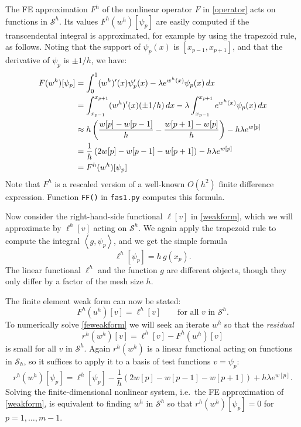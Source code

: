 \documentclass[letterpaper,final,12pt,reqno]{amsart}
\newcommand{\ip}[2]{\left<#1,#2\right>}
\begin{document}
The FE approximation $F^h$ of the nonlinear operator $F$ in \eqref{operator} acts on functions in $\mathcal{S}^h$.  Its values $F^h(w^h)[\psi_p]$ are easily computed if the transcendental integral is approximated, for example by using the trapezoid rule, as follows.  Noting that the support of $\psi_p(x)$ is $[x_{p-1},x_{p+1}]$, and that the derivative of $\psi_p$ is $\pm 1/h$, we have:
\begin{align}
  F(w^h)[\psi_p] &= \int_0^1 (w^h)'(x) \psi_p'(x) - \lambda e^{w^h(x)} \psi_p(x)\, dx  \label{feoperator} \\
    &= \int_{x_{p-1}}^{x_{p+1}} (w^h)'(x) (\pm 1/h)\,dx - \lambda \int_{x_{p-1}}^{x_{p+1}} e^{w^h(x)} \psi_p(x)\, dx \notag \\
    &\approx h \left(\frac{w[p]-w[p-1]}{h} - \frac{w[p+1]-w[p]}{h}\right) - h \lambda e^{w[p]}  \notag \\
    &= \frac{1}{h}\left(2w[p]-w[p-1]-w[p+1]\right) - h \lambda e^{w[p]} \notag \\
    &= F^h(w^h)[\psi_p] \notag
\end{align}
Note that $F^h$ is a rescaled version of a well-known $O(h^2)$ finite difference expression.  Function \texttt{FF()} in \texttt{fas1.py} computes this formula.

Now consider the right-hand-side functional $\ell[v]$ in \eqref{weakform}, which we will approximate by $\ell^h[v]$ acting on $\mathcal{S}^h$.  We again apply the trapezoid rule to compute the integral $\ip{g}{\psi_p}$, and we get the simple formula
\begin{equation}
  \ell^h[\psi_p] = h\, g(x_p). \label{ferhs}
\end{equation}
The linear functional $\ell^h$ and the function $g$ are different objects, though they only differ by a factor of the mesh size $h$.

The finite element weak form can now be stated:
\begin{equation}
  F^h(u^h)[v] = \ell^h[v] \qquad \text{for all } v \text{ in } \mathcal{S}^h. \label{feweakform}
\end{equation}
To numerically solve \eqref{feweakform} we will seek an iterate $w^h$ so that the \emph{residual}
\begin{equation}
  r^h(w^h)[v] = \ell^h[v] - F^h(w^h)[v]  \label{feresidual}
\end{equation}
is small for all $v$ in $\mathcal{S}^h$.  Again $r^h(w^h)$ is a linear functional acting on functions in $\mathcal{S}_h$, so it suffices to apply it to a basis of test functions $v=\psi_p$:
\begin{equation}
  r^h(w^h)[\psi_p] = \ell^h[\psi_p] - \frac{1}{h}\left(2w[p]-w[p-1]-w[p+1]\right) + h \lambda e^{w[p]}.  \label{feresidualdetail}
\end{equation}
Solving the finite-dimensional nonlinear system, i.e.~the FE approximation of \eqref{weakform}, is equivalent to finding $w^h$ in $\mathcal{S}^h$ so that $r^h(w^h)[\psi_p]=0$ for $p=1,\dots,m-1$.
\end{document}

